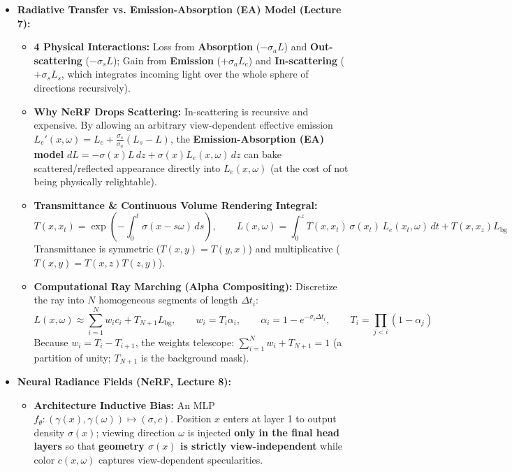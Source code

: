 \documentclass[10pt, a4paper]{article}
\begin{document}
\begin{itemize}
    \item \textbf{Radiative Transfer vs. Emission-Absorption (EA) Model (Lecture 7):}
    \begin{itemize}
        \item \textbf{4 Physical Interactions:} Loss from \textbf{Absorption} ($-\sigma_a L$) and \textbf{Out-scattering} ($-\sigma_s L$); Gain from \textbf{Emission} ($+\sigma_a L_e$) and \textbf{In-scattering} ($+\sigma_s L_s$, which integrates incoming light over the whole sphere of directions recursively).
        \item \textbf{Why NeRF Drops Scattering:} In-scattering is recursive and expensive. By allowing an arbitrary view-dependent effective emission $L_e'(x, \omega) = L_e + \frac{\sigma_s}{\sigma_a}(L_s - L)$, the \textbf{Emission-Absorption (EA) model} $dL = -\sigma(x)L\,dz + \sigma(x)L_e(x,\omega)\,dz$ can bake scattered/reflected appearance directly into $L_e(x,\omega)$ (at the cost of not being physically relightable).
        \item \textbf{Transmittance \& Continuous Volume Rendering Integral:}
        $$T(x, x_t) = \exp\!\left(-\int_0^t \sigma(x - s\omega)\,ds\right), \qquad L(x, \omega) = \int_0^z T(x, x_t)\,\sigma(x_t)\,L_e(x_t, \omega)\,dt + T(x, x_z)L_{\text{bg}}$$
        Transmittance is symmetric ($T(x,y)=T(y,x)$) and multiplicative ($T(x,y)=T(x,z)T(z,y)$).
        \item \textbf{Computational Ray Marching (Alpha Compositing):} Discretize the ray into $N$ homogeneous segments of length $\Delta t_i$:
        $$L(x,\omega) \approx \sum_{i=1}^N w_i c_i + T_{N+1} L_{\text{bg}}, \qquad w_i = T_i \alpha_i, \qquad \alpha_i = 1 - e^{-\sigma_i \Delta t_i}, \qquad T_i = \prod_{j<i}(1 - \alpha_j)$$
        Because $w_i = T_i - T_{i+1}$, the weights telescope: $\sum_{i=1}^N w_i + T_{N+1} = 1$ (a partition of unity; $T_{N+1}$ is the background mask).
    \end{itemize}
    \item \textbf{Neural Radiance Fields (NeRF, Lecture 8):}
    \begin{itemize}
        \item \textbf{Architecture Inductive Bias:} An MLP $f_\theta: (\gamma(x), \gamma(\omega)) \mapsto (\sigma, c)$. Position $x$ enters at layer 1 to output density $\sigma(x)$; viewing direction $\omega$ is injected \textbf{only in the final head layers} so that \textbf{geometry $\sigma(x)$ is strictly view-independent} while color $c(x,\omega)$ captures view-dependent specularities.

\end{itemize}
\end{itemize}
\end{document}
